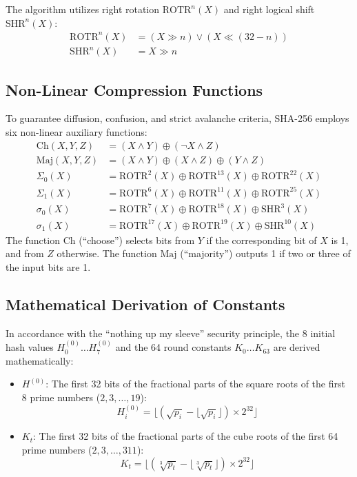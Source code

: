 The algorithm utilizes right rotation $\text{ROTR}^n(X)$ and right logical shift $\text{SHR}^n(X)$:
\begin{align}
\text{ROTR}^n(X) &= (X \gg n) \vee (X \ll (32 - n)) \\
\text{SHR}^n(X) &= X \gg n
\end{align}

\subsection{Non-Linear Compression Functions}
To guarantee diffusion, confusion, and strict avalanche criteria, SHA-256 employs six non-linear auxiliary functions:
\begin{align}
\text{Ch}(X, Y, Z) &= (X \wedge Y) \oplus (\neg X \wedge Z) \\
\text{Maj}(X, Y, Z) &= (X \wedge Y) \oplus (X \wedge Z) \oplus (Y \wedge Z) \\
\Sigma_0(X) &= \text{ROTR}^2(X) \oplus \text{ROTR}^{13}(X) \oplus \text{ROTR}^{22}(X) \\
\Sigma_1(X) &= \text{ROTR}^6(X) \oplus \text{ROTR}^{11}(X) \oplus \text{ROTR}^{25}(X) \\
\sigma_0(X) &= \text{ROTR}^7(X) \oplus \text{ROTR}^{18}(X) \oplus \text{SHR}^3(X) \\
\sigma_1(X) &= \text{ROTR}^{17}(X) \oplus \text{ROTR}^{19}(X) \oplus \text{SHR}^{10}(X)
\end{align}
The function $\text{Ch}$ (``choose'') selects bits from $Y$ if the corresponding bit of $X$ is 1, and from $Z$ otherwise. The function $\text{Maj}$ (``majority'') outputs 1 if two or three of the input bits are 1.

\subsection{Mathematical Derivation of Constants}
In accordance with the ``nothing up my sleeve'' security principle, the 8 initial hash values $H_0^{(0)} \dots H_7^{(0)}$ and the 64 round constants $K_0 \dots K_{63}$ are derived mathematically:
\begin{itemize}
    \item $H^{(0)}$: The first 32 bits of the fractional parts of the square roots of the first 8 prime numbers ($2, 3, \dots, 19$):
    \begin{equation}
    H_i^{(0)} = \lfloor (\sqrt{p_i} - \lfloor\sqrt{p_i}\rfloor) \times 2^{32} \rfloor
    \end{equation}
    \item $K_t$: The first 32 bits of the fractional parts of the cube roots of the first 64 prime numbers ($2, 3, \dots, 311$):
    \begin{equation}
    K_t = \lfloor (\sqrt[3]{p_t} - \lfloor\sqrt[3]{p_t}\rfloor) \times 2^{32} \rfloor
    \end{equation}
\end{itemize}

